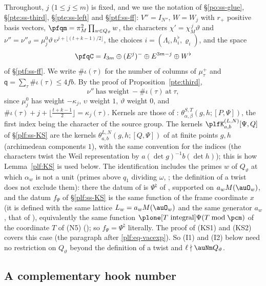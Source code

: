 \documentclass[10pt]{amsart}
\theoremstyle{definition}
\theoremstyle{remark}
\begin{document}
Throughout, $j$ ($1\le j\le m$) is fixed, and we use the notation of \S\ref{po:ss-glue},
\S\ref{pte:ss-third}, \S\ref{pte:ss-left} and \S\ref{ptf:ss-ff}: $V''=I_{N''}$, $W=W_j$ with $r_+$
positive basis vectors, $\pfqm=\pi_M^2\prod_{w\in Q_\vartheta}w$, the characters
$\chi'=\chi_M^{\,j}\vartheta$ and $\nu''=\nu''_\vartheta=\mu^0_j\vartheta\,\upsilon^{j+\lfloor(t+k-1)/2\rfloor}$, the
choices $i=(\Lambda_i,h^\flat_i,\varrho_i)$, and the space
\[
\pfqC=I_{3m}\oplus(E^j)^-\oplus E^{3m-j}\oplus W^\flat
\]
of \S\ref{ptf:ss-ff}. We write $\#\iota(\tau)$ for the number of columns of $\mu^+_\tau$ and
$\mathsf q=\sum_\tau\#\iota(\tau)\le4fb$. By the proof of Proposition~\ref{pte:third},
\begin{equation}\label{pfq:eq-weight}
\nu''\ \text{has weight}\ -\#\iota(\tau)\ \text{at}\ \tau ,
\end{equation}
since $\mu^0_j$ has weight $-\kappa_j$, $\upsilon$ weight $1$, $\vartheta$ weight $0$, and
$\#\iota(\tau)+j+\lfloor\tfrac{t+k-1}2\rfloor=\kappa_j(\tau)$. Kernels are those of {\cite[\S3.1.1]{P53}}:
$\theta^{S,T}_{\alpha,\beta}(g,h;[P,\Psi])$, the first index being the character of the source group.
The kernels $\plfK^{(L,N)}_{a,b}[\Psi,Q]$ of \S\ref{plf:ss-KS} are the kernels
$\theta^{L,N}_{a,b}(g,h;[Q,\Psi])$ of {\cite[\S2.3]{P53}} at finite points $g,h$ (archimedean components
$1$), with the same convention for the indices (the characters twist the Weil representation by
$a(\det g)^{-1}b(\det h)$); this is how Lemma~\ref{plf:KS} is used below. The identification includes
the primes $w$ of $Q_\vartheta$ at which $\alpha_w$ is not a unit (primes above $q_1$ dividing $\omega$,
{\cite[Proposition~6.9]{P53}}; the definition of a twist does not exclude them): there the datum of
{\cite[\S2.3]{P53}} is $\Psi^\natural$ of {\cite[Definition~6.31]{P53}}, supported on $a_wM(\auO_w)$, and
the datum $f_\Psi$ of \S\ref{plf:ss-KS} is the same function of the frame coordinate $x$ (it is defined
with the same lattice $L_w=a_wM(\auO_w)$ and the same generator $a_w$, that of {\cite[\S5.1.1]{P49}}),
equivalently the same function $\plone[T\ \text{integral}]\Psi(T\bmod\pcm)$ of the coordinate $T$ of (N5)
({\cite[Lemma~6.32(c)]{P53}}); so $f_\Psi=\Psi^\natural$ literally. The proof of
(KS1) and (KS2) covers this case (the paragraph after \eqref{plf:eq-vacexp}). So (I1) and (I2) below
need no restriction on $Q_\vartheta$ beyond the definition of a twist and $\ell\nmid\auNm Q_\vartheta$.

\subsection{A complementary hook number}\label{pfq:ss-hook}
\end{document}
